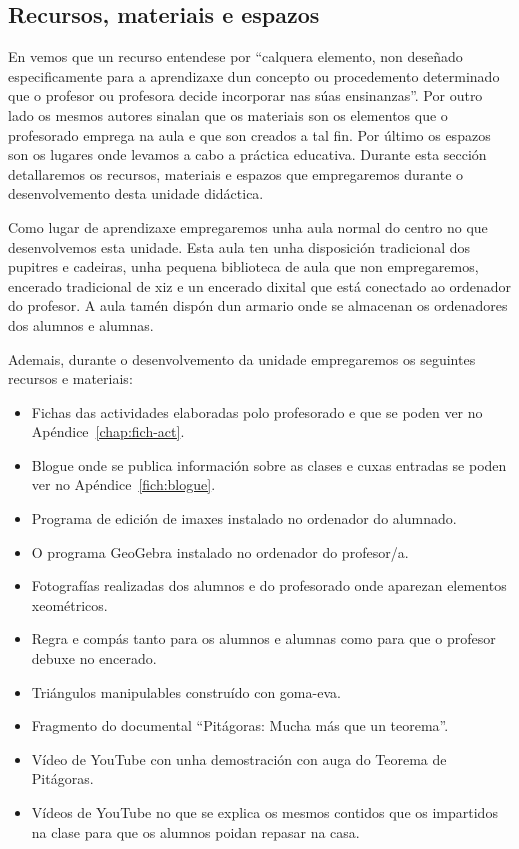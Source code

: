\subsection{Recursos, materiais e espazos}\label{sec:recursos}

En  vemos que un recurso entendese por ``calquera elemento, non deseñado especificamente para a aprendizaxe dun concepto ou procedemento determinado que o profesor ou profesora decide incorporar nas súas ensinanzas''. Por outro lado os mesmos autores sinalan que os materiais son os elementos que o profesorado emprega na aula e que son creados a tal fin. Por último os espazos son os lugares onde levamos a cabo a práctica educativa. Durante esta sección detallaremos os recursos, materiais e espazos que empregaremos durante o desenvolvemento desta unidade didáctica.

Como lugar de aprendizaxe empregaremos unha aula normal do centro no que desenvolvemos esta unidade. Esta aula ten unha disposición tradicional dos pupitres e cadeiras, unha pequena biblioteca de aula que non empregaremos, encerado tradicional de xiz e un encerado dixital que está conectado ao ordenador do profesor. A aula tamén dispón dun armario onde se almacenan os ordenadores dos alumnos e alumnas.

Ademais, durante o desenvolvemento da unidade empregaremos os seguintes recursos e materiais:

\begin{itemize}
    \item Fichas das actividades elaboradas polo profesorado e que se poden ver no Apéndice~\ref{chap:fich-act}.
    \item Blogue onde se publica información sobre as clases e cuxas entradas se poden ver no Apéndice~\ref{fich:blogue}.
    \item Programa de edición de imaxes instalado no ordenador do alumnado.
    \item O programa GeoGebra instalado no ordenador do profesor/a.
    \item Fotografías realizadas dos alumnos e do profesorado onde aparezan elementos xeométricos.
    \item Regra e compás tanto para os alumnos e alumnas como para que o profesor debuxe no encerado.
    \item Triángulos manipulables construído con goma-eva.
    \item Fragmento do documental ``Pitágoras: Mucha más que un teorema''.
    \item Vídeo de YouTube con unha demostración con auga do Teorema de Pitágoras.
    \item Vídeos de YouTube no que se explica os mesmos contidos que os impartidos na clase para que os alumnos poidan repasar na casa.
\end{itemize}
